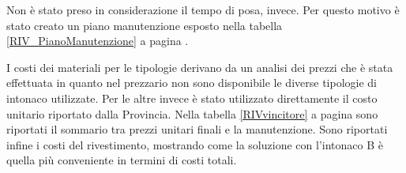 Non è stato preso in considerazione il tempo di posa, invece. 
Per questo motivo è stato creato un piano manutenzione esposto nella tabella \ref{RIV_PianoManutenzione} a pagina \pageref{RIV_PianoManutenzione}.

I costi dei materiali per le tipologie derivano da un analisi dei prezzi che è stata effettuata in quanto nel prezzario non sono disponibile le diverse tipologie di intonaco utilizzate.
Per le altre invece è stato utilizzato direttamente il costo unitario riportato dalla Provincia.
Nella tabella \ref{RIVvincitore} a pagina \pageref{RIVvincitore} sono riportati il sommario tra prezzi unitari finali e la manutenzione. 
Sono riportati infine i costi del rivestimento, mostrando come la soluzione con l'intonaco B è quella più conveniente in termini di costi totali.
